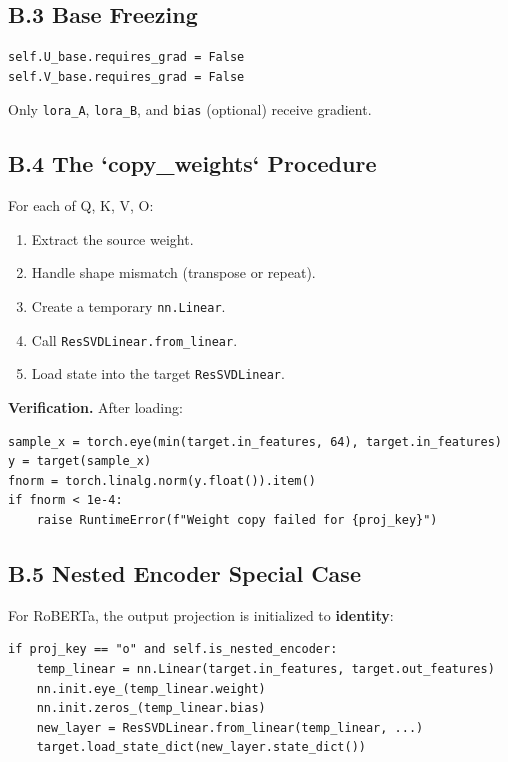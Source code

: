 \subsection{B.3 Base Freezing}

\begin{lstlisting}
self.U_base.requires_grad = False
self.V_base.requires_grad = False
\end{lstlisting}

Only \texttt{lora\_A}, \texttt{lora\_B}, and \texttt{bias} (optional) receive gradient.

\subsection{B.4 The `copy\_weights` Procedure}

For each of Q, K, V, O:

\begin{enumerate}
\item Extract the source weight.
\item Handle shape mismatch (transpose or repeat).
\item Create a temporary \texttt{nn.Linear}.
\item Call \texttt{ResSVDLinear.from\_linear}.
\item Load state into the target \texttt{ResSVDLinear}.

\end{enumerate}
\textbf{Verification.} After loading:

\begin{lstlisting}
sample_x = torch.eye(min(target.in_features, 64), target.in_features)
y = target(sample_x)
fnorm = torch.linalg.norm(y.float()).item()
if fnorm < 1e-4:
    raise RuntimeError(f"Weight copy failed for {proj_key}")
\end{lstlisting}

\subsection{B.5 Nested Encoder Special Case}

For RoBERTa, the output projection is initialized to \textbf{identity}:

\begin{lstlisting}
if proj_key == "o" and self.is_nested_encoder:
    temp_linear = nn.Linear(target.in_features, target.out_features)
    nn.init.eye_(temp_linear.weight)
    nn.init.zeros_(temp_linear.bias)
    new_layer = ResSVDLinear.from_linear(temp_linear, ...)
    target.load_state_dict(new_layer.state_dict())
\end{lstlisting}

